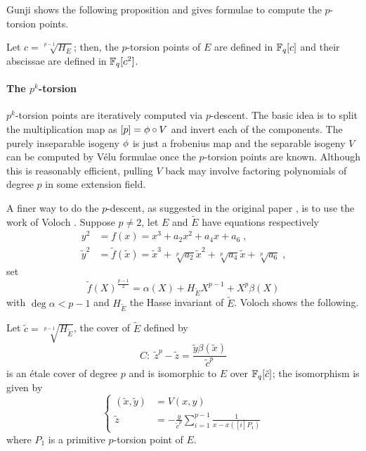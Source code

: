 Gunji shows the following proposition and gives formulae to compute
the $p$-torsion points.

\begin{proposition}
  \label{th:gunji}
  Let $c=\sqrt[p-1]{H_E}$; then, the $p$-torsion points of $E$ are
  defined in $\mathbb{F}_q[c]$ and their abscissae are defined in $\mathbb{F}_q[c^2]$.
\end{proposition}


\paragraph{The $p^k$-torsion}
$p^k$-torsion points are iteratively computed via $p$-descent. The
basic idea is to split the multiplication map as $[p] = \phi\circ
V$ and invert each of the components. The purely inseparable isogeny
$\phi$ is just a frobenius map and the separable isogeny $V$ can
be computed by Vélu formulae once the $p$-torsion points are
known. Although this is reasonably efficient, pulling $V$ back may
involve factoring polynomials of degree $p$ in some extension field.

A finer way to do the $p$-descent, as suggested in the original paper
\cite{Cou96}, is to use the work of Voloch \cite{Vol90}. Suppose
$p\ne2$, let $E$ and $\widetilde{E}$ have equations respectively
\begin{align*}
  y^2&=f(x)=x^3+a_2x^2+a_4x+a_6 \;\text{,}\\
  \tilde{y}^2&=\tilde{f}(\tilde{x}) = \tilde{x}^3 +
  \sqrt[p]{a_2}\tilde{x}^2 + \sqrt[p]{a_4}\tilde{x} + \sqrt[p]{a_6}
  \;\text{,}
\end{align*}
set
 \begin{equation}
  \label{eq:voloch:cover}
  \tilde{f}(X)^{\frac{p-1}{2}} = \alpha(X) + H_{\widetilde{E}}X^{p-1} + X^p\beta(X)
\end{equation}
with $\deg \alpha < p-1$ and $H_{\widetilde{E}}$ the Hasse invariant
of $\widetilde{E}$. Voloch shows the following.

\begin{proposition}
  \label{th:voloch}
  Let $\tilde{c} = \sqrt[p-1]{H_{\widetilde{E}}}$, the cover of
  $\widetilde{E}$ defined by
  \begin{equation}
    \label{th:voloch:cover}
    C:\; \tilde{z}^p - \tilde{z} = \frac{\tilde{y}\beta(\tilde{x})}{\tilde{c}^p}
  \end{equation}
  is an étale cover of degree $p$ and is isomorphic to $E$ over
  $\mathbb{F}_q[\tilde{c}]$; the isomorphism is given by
  \begin{equation}
    \label{th:voloch:isom}
    \left\{
      \begin{aligned}
        (\tilde{x}, \tilde{y}) &= V(x, y)\\
        \tilde{z} &= -\frac{y}{\tilde{c}^p}\sum_{i=1}^{p-1}\frac{1}{x - x([i]P_1)}
      \end{aligned}
    \right.
  \end{equation}
  where $P_1$ is a primitive $p$-torsion point of $E$.
\end{proposition}

